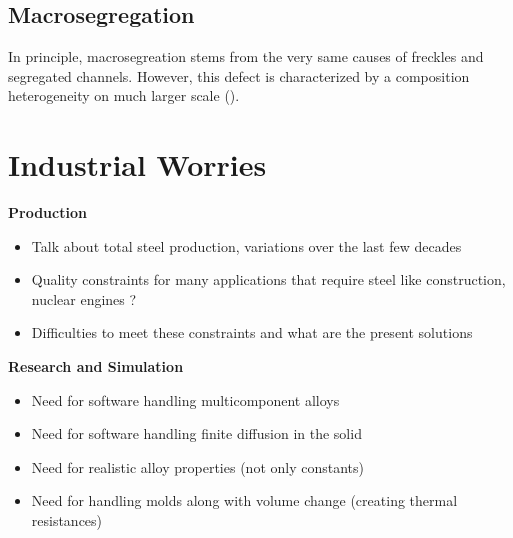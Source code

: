 \subsection*{Macrosegregation}
In principle, macrosegreation stems from the very same causes of freckles and segregated channels. However, this defect is characterized by a composition heterogeneity on much larger scale (). 


\section*{Industrial Worries}
\textbf{Production}

\begin{itemize}
\item Talk about total steel production, variations over the last few decades
\item Quality constraints for many applications that require steel like construction, nuclear engines ? 
\item Difficulties to meet these constraints and what are the present solutions
\end{itemize}
\textbf{Research and Simulation}
\begin{itemize}
\item Need for software handling multicomponent alloys
\item Need for software handling finite diffusion in the solid
\item Need for realistic alloy properties (not only constants)
\item Need for handling molds along with volume change (creating thermal resistances)
\end{itemize}

